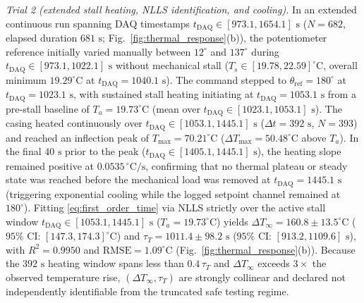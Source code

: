 \documentclass[lettersize,journal]{IEEEtran}
\begin{document}
	\textit{Trial 2 (extended stall heating, NLLS identification, and cooling).} In an extended continuous run spanning DAQ timestamps $t_{\text{DAQ}} \in [973.1, 1654.1]\text{ s}$ ($N = 682$, elapsed duration $681\text{ s}$; Fig.~\ref{fig:thermal_response}(b)), the potentiometer reference initially varied manually between $12^\circ$ and $137^\circ$ during $t_{\text{DAQ}} \in [973.1, 1022.1]\text{ s}$ without mechanical stall ($T_s \in [19.78, 22.59]^\circ\text{C}$, overall minimum $19.29^\circ\text{C}$ at $t_{\text{DAQ}} = 1040.1\text{ s}$). The command stepped to $\theta_{\text{ref}} = 180^\circ$ at $t_{\text{DAQ}} = 1023.1\text{ s}$, with sustained stall heating initiating at $t_{\text{DAQ}} = 1053.1\text{ s}$ from a pre-stall baseline of $T_a = 19.73^\circ\text{C}$ (mean over $t_{\text{DAQ}} \in [1023.1, 1053.1]\text{ s}$). The casing heated continuously over $t_{\text{DAQ}} \in [1053.1, 1445.1]\text{ s}$ ($\Delta t = 392\text{ s}$, $N = 393$) and reached an inflection peak of $T_{\max} = 70.21^\circ\text{C}$ ($\Delta T_{\max} = 50.48^\circ\text{C}$ above $T_a$). In the final $40\text{ s}$ prior to the peak ($t_{\text{DAQ}} \in [1405.1, 1445.1]\text{ s}$), the heating slope remained positive at $0.0535\,^\circ\text{C/s}$, confirming that no thermal plateau or steady state was reached before the mechanical load was removed at $t_{\text{DAQ}} = 1445.1\text{ s}$ (triggering exponential cooling while the logged setpoint channel remained at $180^\circ$). Fitting \eqref{eq:first_order_time} via NLLS strictly over the active stall window $t_{\text{DAQ}} \in [1053.1, 1445.1]\text{ s}$ ($T_a = 19.73^\circ\text{C}$) yields $\Delta T_\infty = 160.8 \pm 13.5^\circ\text{C}$ ($95\%$ CI: $[147.3, 174.3]^\circ\text{C}$) and $\tau_T = 1011.4 \pm 98.2\text{ s}$ ($95\%$ CI: $[913.2, 1109.6]\text{ s}$), with $R^2 = 0.9950$ and $\text{RMSE} = 1.09^\circ\text{C}$ (Fig.~\ref{fig:thermal_response}(b)). Because the $392\text{ s}$ heating window spans less than $0.4\,\tau_T$ and $\Delta T_\infty$ exceeds $3\times$ the observed temperature rise, $(\Delta T_\infty, \tau_T)$ are strongly collinear and declared not independently identifiable from the truncated safe testing regime.
	
\end{document}
